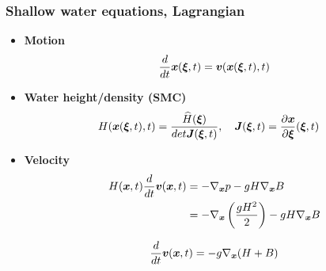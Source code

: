 \documentclass[pt12]{beamer}
\newcommand{\uvec}[2][3]{\boldsymbol{#2\mkern-#1mu}\mkern#1mu}
\begin{document}
\begin{frame}
\frametitle{Shallow water equations, Lagrangian}

\begin{itemize}

\item \textbf{Motion}
$$\frac{d}{dt}\uvec{x}(\uvec{\xi},t)=\uvec{v}(\uvec{x}(\uvec{\xi},t),t)$$

\item \textbf{Water height/density (SMC)} 
\begin{align*}
&H(\uvec{x}(\uvec{\xi},t),t)=\frac{\widehat{H}(\uvec{\xi})}{det \uvec{J}(\uvec{\xi},t)}, \quad \uvec{J}(\uvec{\xi},t)=\frac{\partial \uvec{x}}{\partial \uvec{\xi}}(\uvec{\xi},t)
\end{align*}


\item \textbf{Velocity} 
\begin{align*}
H(\uvec{x},t)\frac{d}{dt}\uvec{v}(\uvec{x},t)&=-\nabla_{\uvec{x}} p  -g H \nabla_{\uvec{x}}B\\
&=-\nabla_{\uvec{x}}\left(\frac{gH^2}{2}\right) -gH\nabla_{\uvec{x}}B
\end{align*}

$$\frac{d}{dt}\uvec{v}(\uvec{x},t)=-g\nabla_{\uvec{x}}(H+B)$$

\end{itemize}


\end{frame}
\end{document}
